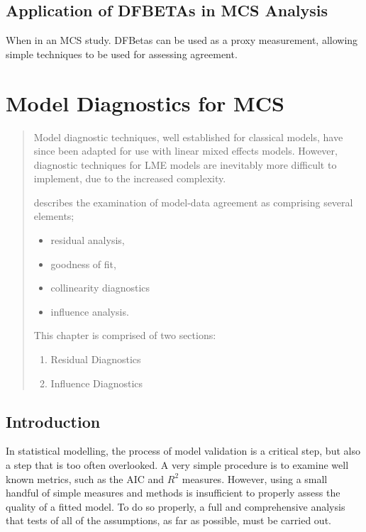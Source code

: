 \documentclass[Main.tex]{subfiles}
\begin{document}
\section{Application of DFBETAs in MCS Analysis}


When in an MCS study. DFBetas can be used as a proxy measurement, allowing simple techniques to be used for assessing agreement.



\chapter{Model Diagnostics for MCS}

\begin{abstract}
Model diagnostic techniques, well established for classical models, have since been adapted for use with linear mixed effects models. However, diagnostic techniques for LME models are inevitably more difficult to implement, due to the increased complexity. \\ \bigskip


\citet{schab} describes the examination of model-data agreement as comprising several elements; \begin{itemize}
		\item residual analysis, 
		\item goodness of fit, 
		\item collinearity diagnostics
		\item influence analysis.
	\end{itemize} 
	
This chapter is comprised of two sections:
\begin{enumerate}
	\item Residual Diagnostics
	\item Influence Diagnostics
\end{enumerate}
\end{abstract}

\newpage
\section{Introduction}
In statistical modelling, the process of model validation is a critical step, but also a step that is too often overlooked. A very simple procedure is to examine well known
metrics, such as the AIC and $R^2$ measures. However, using a small handful of simple measures and methods is insufficient to properly assess the quality of a fitted model. To do so properly, a full and comprehensive
analysis that tests of all of the assumptions, as far as possible, must be carried out. 
\end{document}
